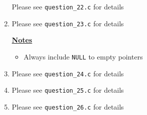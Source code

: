 \documentclass[12pt]{article}
\begin{document}
\begin{enumerate}[1.]
    Please see \texttt{question\_22.c} for details

    \item

    Please see \texttt{question\_23.c} for details

    \bigskip

    \underline{\textbf{Notes}}

    \begin{itemize}
        \item Always include \texttt{NULL} to empty pointers
    \end{itemize}

    \item

    Please see \texttt{question\_24.c} for details

    \item

    Please see \texttt{question\_25.c} for details

    \item

    Please see \texttt{question\_26.c} for details


\end{enumerate}
\end{document}
